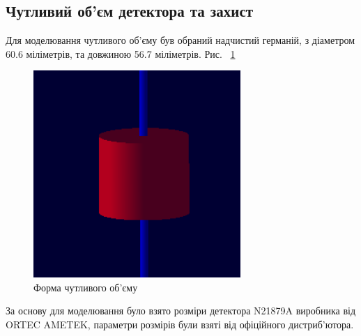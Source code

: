 \documentclass[a4paper, 14pt]{article}
\numberwithin{equation}{section}
\numberwithin{table}{section}
\begin{document}
\subsection{Чутливий об'єм детектора та захист}
Для моделювання чутливого об'єму був обраний надчистий германій, з діаметром 60.6 міліметрів, та довжиною 56.7 міліметрів. Рис. ~\ref{ris:s_detector_volume} 	
\begin{figure}[hbt!]
	\centering \includegraphics[width=0.7\textwidth]{images/sDetector158cm3.png}
	\caption{Форма чутливого об'єму} 
	\label{ris:s_detector_volume}	
\end{figure}
За основу для моделювання було взято розміри детектора N21879A виробника від ORTEC AMETEK, параметри розмірів були взяті від офіційного дистриб'ютора.
\end{document}
